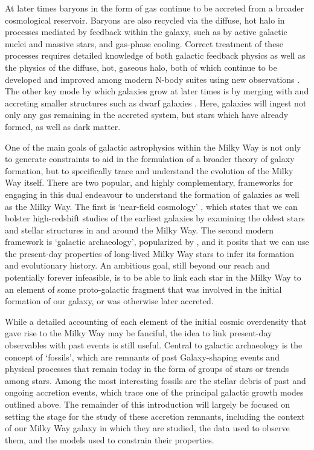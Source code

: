 At later times baryons in the form of gas continue to be accreted from a broader cosmological reservoir. Baryons are also recycled via the diffuse, hot halo in processes mediated by feedback within the galaxy, such as by active galactic nuclei and massive stars, and gas-phase cooling. Correct treatment of these processes requires detailed knowledge of both galactic feedback physics as well as the physics of the diffuse, hot, gaseous halo, both of which continue to be developed and improved among modern N-body suites using new observations \parencite[see][]{crain23}. The other key mode by which galaxies grow at later times is by merging with and accreting smaller structures such as dwarf galaxies \parencite{lacey93}. Here, galaxies will ingest not only any gas remaining in the accreted system, but stars which have already formed, as well as dark matter.

One of the main goals of galactic astrophysics within the Milky Way is not only to generate constraints to aid in the formulation of a broader theory of galaxy formation, but to specifically trace and understand the evolution of the Milky Way itself. There are two popular, and highly complementary, frameworks for engaging in this dual endeavour to understand the formation of galaxies as well as the Milky Way. The first is `near-field cosmology' \parencite{bland-hawthorn99,frebel15}, which states that we can bolster high-redshift studies of the earliest galaxies by examining the oldest stars and stellar structures in and around the Milky Way. The second modern framework is `galactic archaeology', popularized by \textcite{freeman02}, and it posits that we can use the present-day properties of long-lived Milky Way stars to infer its formation and evolutionary history. An ambitious goal, still beyond our reach and potentially forever infeasible, is to be able to link each star in the Milky Way to an element of some proto-galactic fragment that was involved in the initial formation of our galaxy, or was otherwise later accreted.

While a detailed accounting of each element of the initial cosmic overdensity that gave rise to the Milky Way may be fanciful, the idea to link present-day observables with past events is still useful. Central to galactic archaeology is the concept of `fossils', which are remnants of past Galaxy-shaping events and physical processes that remain today in the form of groups of stars or trends among stars. Among the most interesting fossils are the stellar debris of past and ongoing accretion events, which trace one of the principal galactic growth modes outlined above. The remainder of this introduction will largely be focused on setting the stage for the study of these accretion remnants, including the context of our Milky Way galaxy in which they are studied, the data used to observe them, and the models used to constrain their properties.